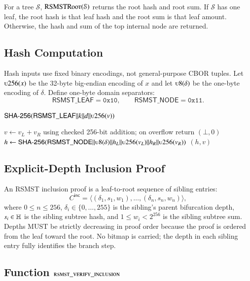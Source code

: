 For a tree $\mathcal{S}$, $\Call{RSMSTRoot}{\mathcal{S}}$ returns the root hash and root sum. If $\mathcal{S}$ has one leaf, the root hash is that leaf hash and the root sum is that leaf amount. Otherwise, the  hash and sum of the top internal node are returned.

\subsection{Hash Computation}

Hash inputs use fixed binary encodings, not general-purpose CBOR tuples. Let $\Call{u256}{x}$ be the 32-byte big-endian encoding of $x$ and let $\Call{u8}{\delta}$ be the one-byte encoding of $\delta$. Define one-byte domain separators:
\[
\mathsf{RSMST\_LEAF}=\mathtt{0x10},\qquad
\mathsf{RSMST\_NODE}=\mathtt{0x11}.
\]

\begin{algorithmic}
		\State \Return $\mathsf{SHA\text{-}256}(\mathsf{RSMST\_LEAF}\|k\|d\|\Call{u256}{v})$
	\EndFunction
\end{algorithmic}

\begin{algorithmic}
		\State $v \gets v_L+v_R$ using checked 256-bit addition; on overflow return $(\bot,0)$
		\State $h \gets \mathsf{SHA\text{-}256}(\mathsf{RSMST\_NODE}\|\Call{u8}{\delta}\|h_L\|\Call{u256}{v_L}\|h_R\|\Call{u256}{v_R})$
		\State \Return $(h,v)$
	\EndFunction
\end{algorithmic}

\subsection{Explicit-Depth Inclusion Proof}\label{sec:rsmst-inclusion-proof}

An RSMST inclusion proof is a leaf-to-root sequence of sibling entries:
\[
C^\mathsf{inc}=\langle(\delta_1,s_1,w_1),\ldots,(\delta_n,s_n,w_n)\rangle,
\]
where $0\leq n\leq256$, $\delta_i\in\{0,\ldots,255\}$ is the sibling's parent bifurcation depth, $s_i\in\mathbb{H}$ is the sibling subtree hash, and $1\leq w_i<2^{256}$ is the sibling subtree sum. Depths MUST be strictly decreasing in proof order because the proof is ordered from the leaf toward the root. No bitmap is carried; the depth in each sibling entry fully identifies the branch step.

\subsection{Function $\textsc{rsmst\_verify\_inclusion}$}\label{sec:rsmst-verify-inclusion}

